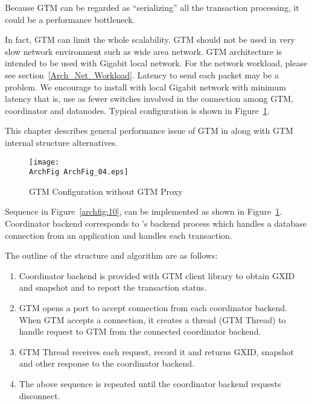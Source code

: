 

  Because GTM can be regarded as ``serializing'' all the transaction processing,
  it could be a performance bottleneck.
  
  In fact, GTM can limit the whole scalability.
  GTM should not be used in very slow network environment such as wide area network.
  GTM architecture is intended to be used with Gigabit local network.
  For the network workload, please see section~\ref{Arch_Net_Workload}.
  Latency to send each packet may be a problem.
  We encourage to install \XC{} with local Gigabit network with minimum latency
  that is, use as fewer switches involved in the connection among GTM,
  coordinator and datanodes.
  Typical configuration is shown in Figure~\ref{archfig:11}.
  
  This chapter describes general performance issue of GTM in \XC{} along with
  GTM internal structure alternatives.
  
  \begin{figure}[htp]
	  \begin{center}
		  \texttt{[image: \\ArchFig ArchFig\_04.eps]}
		  \caption{\label{archfig:11}GTM Configuration without GTM Proxy}
	  \end{center}
  \end{figure}
  


  
  Sequence in Figure~\ref{archfig:10}, can be implemented as shown in
  Figure~\ref{archfig:11}.
  Coordinator backend corresponds to \PG's backend process which handles
  a database connection from an application and handles each transaction.
  
  The outline of the structure and algorithm are as follows:
  
  \begin{enumerate}
	  \item Coordinator backend is provided with GTM client library to obtain GXID and
	  		snapshot and to report the transaction status.
	  \item GTM opens a port to accept connection from each coordinator backend.
	  		When GTM accepts a connection, it creates a thread (GTM Thread) to handle
			request to GTM from the connected coordinator backend.
	  \item GTM Thread receives each request, record it and returns GXID, snapshot and
	  		other response to the coordinator backend.
	  \item The above sequence is repeated until the coordinator backend requests
	  		disconnect.
  \end{enumerate}
  
